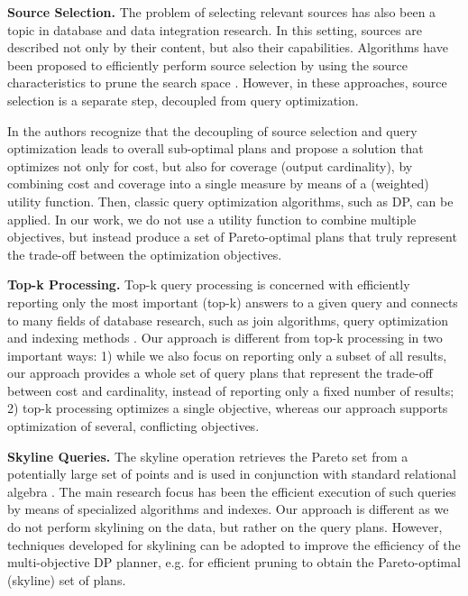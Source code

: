 \textbf{Source Selection.} The problem of selecting relevant sources
has also been a topic in database and data integration research. In
this setting, sources are described not only by their content, but
also their capabilities. Algorithms have been proposed to efficiently
perform source selection by using the source characteristics to prune
the search space \cite{levy_querying_1996}. However, in these
approaches, source selection is a separate step, decoupled from query
optimization.

In \cite{nie_joint_2001} the authors recognize that the decoupling of
source selection and query optimization leads to overall sub-optimal
plans and propose a solution that optimizes not only for cost, but
also for coverage (output cardinality), by combining cost and coverage
into a single measure by means of a (weighted) utility function. Then,
classic query optimization algorithms, such as DP, can be applied. In
our work, we do not use a utility function to combine multiple
objectives, but instead produce a set of Pareto-optimal plans that
truly represent the trade-off between the optimization objectives.

\textbf{Top-k Processing.} Top-k query processing is concerned with
efficiently reporting only the most important (top-k) answers to a
given query and connects to many fields of database research, such as
join algorithms, query optimization and indexing methods
\cite{ilyas_survey_2008}. Our approach is different from top-k
processing in two important ways: 1) while we also focus on reporting
only a subset of all results, our approach provides a whole set of
query plans that represent the trade-off between cost and cardinality,
instead of reporting only a fixed number of results; 2) top-k
processing optimizes a single objective, whereas our approach supports
optimization of several, conflicting objectives.

\textbf{Skyline Queries.} The skyline operation retrieves the Pareto
set from a potentially large set of points and is used in conjunction
with standard relational algebra \cite{boerzsoenyi_skyline_2001}. The
main research focus has been the efficient execution of such queries
by means of specialized algorithms and indexes. Our approach is
different as we do not perform skylining on the data, but rather on
the query plans. However, techniques developed for skylining can be
adopted to improve the efficiency of the multi-objective DP planner,
e.g. for efficient pruning to obtain the Pareto-optimal (skyline) set
of plans.



